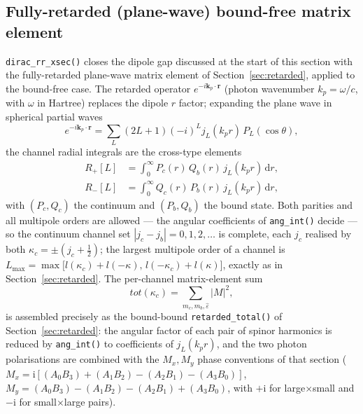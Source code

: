 \documentclass[11pt,a4paper]{article}
\newcommand{\dif}{\mathrm{d}}
\newcommand{\iu}{\mathrm{i}}
\renewcommand{\vec}[1]{\bm{#1}}
\begin{document}
\subsection{Fully-retarded (plane-wave) bound-free matrix element}
\label{sec:retarded-bf}

{\tt dirac\_rr\_xsec()} closes the dipole gap discussed at the start of
this section with the fully-retarded plane-wave matrix element of
Section~\ref{sec:retarded}, applied to the bound-free case.
The retarded operator $e^{-i\vec{k}_{p}\cdot\vec{r}}$ (photon wavenumber
$k_{p}=\omega/c$, with $\omega$ in Hartree) replaces the dipole $r$
factor; expanding the plane wave in spherical partial waves
\begin{equation}
  e^{-i\vec{k}_{p}\cdot\vec{r}}
  = \sum_{L}(2L+1)(-i)^{L}j_{L}(k_{p}r)\,P_{L}(\cos\theta),
\end{equation}
the channel radial integrals are the cross-type elements
\begin{align}
  R_{+}[L] &= \int_{0}^{\infty}\!
    P_{c}(r)\,Q_{b}(r)\,j_{L}(k_{p}r)\,\dif r,\\
  R_{-}[L] &= \int_{0}^{\infty}\!
    Q_{c}(r)\,P_{b}(r)\,j_{L}(k_{p}r)\,\dif r,
  \label{eq:bfret_radial}
\end{align}
with $(P_{c},Q_{c})$ the continuum and $(P_{b},Q_{b})$ the bound state.
Both parities and all multipole orders are allowed --- the angular
coefficients of {\tt ang\_int()} decide --- so the continuum channel set
$|j_{c}-j_{b}|=0,1,2,\ldots$ is complete, each $j_{c}$ realised by both
$\kappa_{c}=\pm(j_{c}+\tfrac12)$; the largest multipole order of a
channel is
$L_{\max}=\max\bigl[l(\kappa_{c})+l(-\kappa),\,
l(-\kappa_{c})+l(\kappa)\bigr]$, exactly as in
Section~\ref{sec:retarded}.  The per-channel matrix-element sum
\begin{equation}
  \mathit{tot}(\kappa_{c})
  = \sum_{m_{c},m_{b},\hat{\varepsilon}}|M|^{2},
  \label{eq:bfret_tot}
\end{equation}
is assembled precisely as the bound-bound {\tt retarded\_total()} of
Section~\ref{sec:retarded}: the angular factor of each pair of spinor
harmonics is reduced by {\tt ang\_int()} to coefficients of
$j_{L}(k_{p}r)$, and the two photon polarisations are combined with the
$M_{x},M_{y}$ phase conventions of that section
($M_{x}=\iu[(A_{0}B_{3})+(A_{1}B_{2})-(A_{2}B_{1})-(A_{3}B_{0})]$,
$M_{y}=(A_{0}B_{3})-(A_{1}B_{2})-(A_{2}B_{1})+(A_{3}B_{0})$, with $+\iu$
for large$\times$small and $-\iu$ for small$\times$large pairs).
\end{document}
